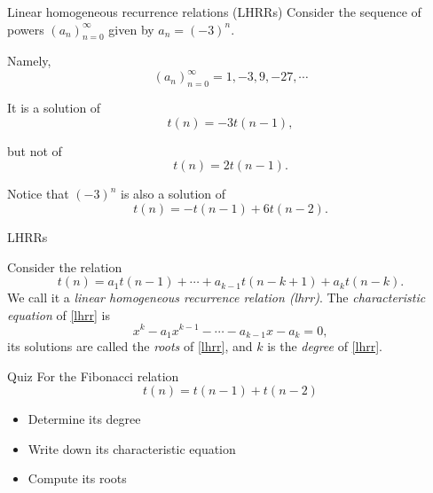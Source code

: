 \documentclass{beamer}
\begin{document}
%

\begin{frame}{Linear homogeneous recurrence relations (LHRRs)}
	Consider the sequence of powers $(a_n)_{n=0}^\infty$ given by $a_n = (-3)^n$.

	\bigskip
	Namely,
	\begin{equation*}
		(a_n)_{n=0}^\infty = 1, -3, 9, -27, \cdots
	\end{equation*}

	It is a solution of 
	\begin{displaymath}
		t(n)= -3t(n-1),
	\end{displaymath} 

	but not of
	\begin{displaymath}
		t(n)= 2t(n-1).
	\end{displaymath}

	Notice that $(-3)^n$ is also a solution of
	\begin{displaymath}
		t(n)= -t(n-1) + 6t(n-2).
	\end{displaymath}
\end{frame}

%

\begin{frame}{LHRRs}
	\begin{defn}
		Consider the relation
		\begin{equation}\label{lhrr}
			t(n)= a_1t(n-1) + \cdots + a_{k-1}t(n-k+1) + a_kt(n-k).
		\end{equation}
		We call it a \emph{linear homogeneous recurrence relation (lhrr)}.
		The \emph{characteristic equation} of \eqref{lhrr} is
		\begin{equation}\label{cheq}
			x^k - a_1x^{k-1} - \cdots - a_{k-1}x - a_k = 0,
		\end{equation}
		its solutions are called the \emph{roots} of \eqref{lhrr}, and $k$ is
		the \emph{degree} of \eqref{lhrr}.
	\end{defn}
\end{frame}

%

\begin{frame}{Quiz}
		For the Fibonacci relation
		\begin{equation*}
			t(n)= t(n-1) + t(n-2)
		\end{equation*}
		\begin{itemize}
			\item Determine its degree
			\item Write down its characteristic equation
			\item Compute its roots
		\end{itemize}
\end{frame}
\end{document}
